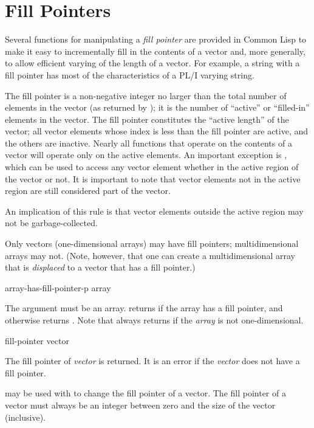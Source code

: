 \section{Fill Pointers}
\label{FILL-POINTER}

Several functions for manipulating a \emph{fill pointer} are provided
in Common Lisp
to make it easy to incrementally fill in the contents of a vector
and, more generally, to allow efficient varying of the length of a vector.
For example, a string with a fill pointer has most of the characteristics
of a PL/I varying string.

The fill pointer is a non-negative integer no larger than the total
number of elements in the vector (as returned by );
it is the number of ``active'' or ``filled-in'' elements in the vector.
The fill pointer constitutes the ``active length'' of the vector;
all vector elements whose index is less than the fill pointer are
active, and the others are inactive.
Nearly all functions that operate on the contents of a vector
will operate only on the active elements.  An important exception
is , which can be used to access any vector element
whether in the active region of the vector or not.  It is important
to note that vector elements not in the active region are still considered
part of the vector.

\beforenoterule
\begin{implementation}
An implication of this rule is that
vector elements outside the active region may not be garbage-collected.
\end{implementation}
\afternoterule

Only vectors (one-dimensional arrays) may have fill pointers;
multidimensional arrays may not.  (Note, however, that one can create
a multidimensional array that is \emph{displaced} to a vector that has
a fill pointer.)

\begin{defun}[Function]
array-has-fill-pointer-p array

The argument must be an array.   returns
{\true} if the array has a fill pointer, and otherwise returns {\false}.
Note that
always returns {\false} if
the \emph{array} is not one-dimensional.
\end{defun}

\begin{defun}[Function]
fill-pointer vector

The fill pointer of \emph{vector} is returned.  It is an error if
the \emph{vector} does not have a fill pointer.

 may be used with  to change the fill pointer
of a vector.  The fill pointer of a vector must always be an integer
between zero and the size of the vector (inclusive).
\end{defun}

